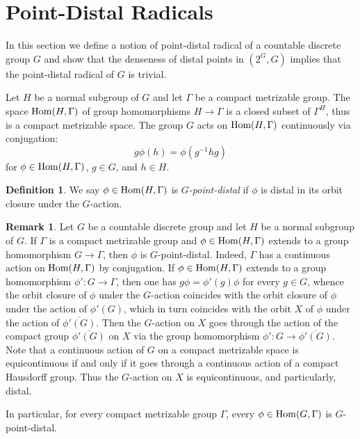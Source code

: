 \documentclass[11pt]{amsart}
\theoremstyle{definition}
\newtheorem{definition}[theorem]{Definition}
\newtheorem{remark}[theorem]{Remark}
\numberwithin{equation}{section}
\theoremstyle{definition}
\newcommand{\Hom}{{\rm Hom}}
\begin{document}
\section{Point-Distal Radicals\label{sec:6}}

In this section we define a notion of point-distal radical of a countable discrete group $G$ and show that the denseness of distal points in $(2^G, G)$ implies that the point-distal radical of $G$ is trivial. 

Let $H$ be a normal subgroup of $G$ and let $\Gamma$ be a compact  metrizable group. The space $\Hom(H, \Gamma)$ of group homomorphisms $H\rightarrow \Gamma$ is a closed subset of $\Gamma^H$, thus is a  compact metrizable space. The group $G$ acts on $\Hom(H, \Gamma)$ continuously via conjugation: 
$$g\phi(h)=\phi(g^{-1}hg)$$
for $\phi\in \Hom(H, \Gamma)$, $g\in G$, and $h\in H$. 

\begin{definition} We say $\phi\in \Hom(H, \Gamma)$ is {\it $G$-point-distal} if $\phi$ is distal in its orbit closure under the $G$-action. 
\end{definition}

\begin{remark} \label{R-extension to distal}
Let $G$ be a countable discrete group and let $H$ be a normal subgroup of $G$. If $\Gamma$ is a compact metrizable group and $\phi\in \Hom(H, \Gamma)$ extends to a group homomorphism $G\rightarrow \Gamma$, then $\phi$ is $G$-point-distal. Indeed, $\Gamma$ has a continuous action on $\Hom(H, \Gamma)$ by conjugation. If $\phi\in \Hom(H, \Gamma)$ extends to a group homomorphism $\phi': G\rightarrow \Gamma$, then one has $g\phi=\phi'(g)\phi$ for every $g\in G$, whence the orbit closure of $\phi$ under the $G$-action coincides with the orbit closure of $\phi$ under the action of $\phi'(G)$, which in turn coincides with the orbit $X$ of $\phi$ under the action of $\overline{\phi'(G)}$.  Then the $G$-action on $X$ goes through the action of the compact group 
$\overline{\phi'(G)}$ on $X$ via the group homomorphism $\phi': G\rightarrow \overline{\phi'(G)}$. Note that  a continuous action of $G$ on a compact metrizable space is equicontinuous if and only if it goes through a continuous action of a compact Hausdorff group. Thus the $G$-action on $X$ is equicontinuous, and particularly, distal. 

In particular, for every compact metrizable group $\Gamma$, every $\phi\in \Hom(G, \Gamma)$ is $G$-point-distal. 
\end{remark} 
\end{document}
